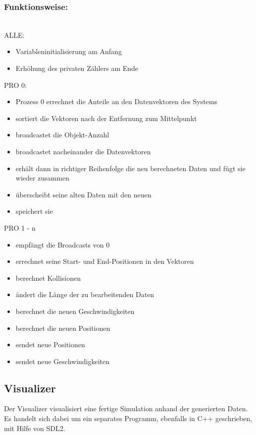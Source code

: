 \subsubsection{Funktionsweise:}
\ \\
ALLE:
\begin{itemize}
   \item Variableninitialisierung am Anfang
   \item Erhöhung des privaten Zählers am Ende
\end{itemize}
PRO 0:
\begin{itemize}
    \item Prozess 0 errechnet die Anteile an den Datenvektoren des Systems
    \item sortiert die Vektoren nach der Entfernung zum Mittelpunkt 
    \item broadcastet die Objekt-Anzahl
    \item broadcastet nacheinander die Datenvektoren
    \item erhält dann in richtiger Reihenfolge die neu berechneten Daten und fügt sie wieder zusammen
    \item überscheibt seine alten Daten mit den neuen
    \item speichert sie
\end{itemize}
PRO 1 - n
\begin{itemize}
    \item empfängt die Broadcasts von 0
    \item errechnet seine Start- und End-Positionen in den Vektoren
    \item berechnet Kollisionen
    \item ändert die Länge der zu bearbeitenden Daten
    \item berechnet die neuen Geschwindigkeiten
    \item berechnet die neuen Positionen
    \item sendet neue Positionen
    \item sendet neue Geschwindigkeiten
\end{itemize}



\subsection{Visualizer}
Der Visualizer visualisiert eine fertige Simulation anhand der generierten Daten.
Es handelt sich dabei um ein separates Programm, ebenfalls in C++ geschrieben,
mit Hilfe von SDL2.

